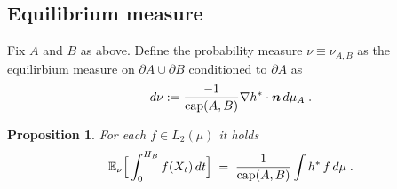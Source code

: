 \documentclass[reqno]{amsart}
\newtheorem{proposition}[theorem]{Proposition}
\newcounter{as}[section]
\newcommand{\bb}[1]{{\mathbb #1}}
\newcommand{\bs}[1]{{\boldsymbol #1}}
\newcommand{\<}{\langle}
\renewcommand{\>}{\rangle}
\renewcommand{\Cap}{{\rm cap}}
\begin{document}
\subsection{Equilibrium measure}
Fix $A$ and $B$ as above. Define the probability measure $\nu\equiv
\nu_{A,B}$ as the equilirbium measure on $\partial A \cup \partial B$
conditioned to $\partial A$ as
\begin{equation*}
d\nu:=\frac{- 1}{\Cap(A,B)} \nabla h^* \cdot \bs n\, d\mu_A\;.
\end{equation*}
\begin{proposition}
\label{p:harmcap}
For each $f\in L_2(\mu) $ it holds
\begin{equation*}
\bb E_{\nu}\Big[ \int_0^{H_B}f(X_t)\, dt\Big] \;=\;
\frac{1}{\Cap(A,B)}\int h^*\,f\,d\mu\;.
\end{equation*}
\end{proposition}
\end{document}
